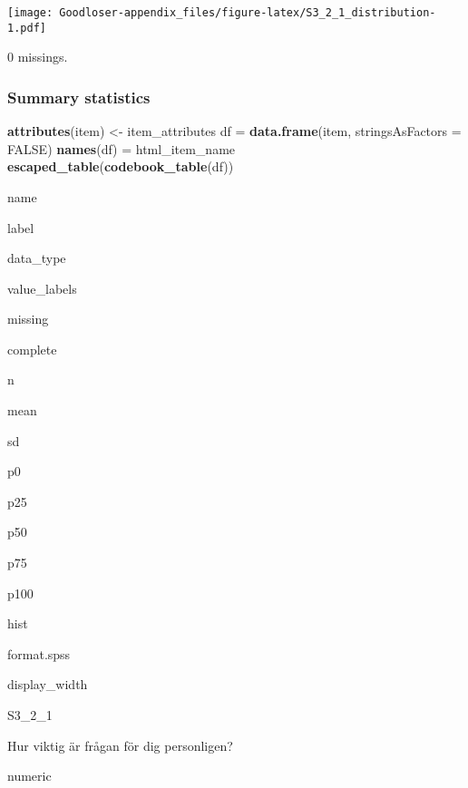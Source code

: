 \documentclass[]{book}
\newenvironment{Shaded}{\begin{snugshade}}{\end{snugshade}}
\newcommand{\KeywordTok}[1]{\textcolor[rgb]{0.13,0.29,0.53}{\textbf{#1}}}
\newcommand{\DataTypeTok}[1]{\textcolor[rgb]{0.13,0.29,0.53}{#1}}
\newcommand{\StringTok}[1]{\textcolor[rgb]{0.31,0.60,0.02}{#1}}
\newcommand{\OtherTok}[1]{\textcolor[rgb]{0.56,0.35,0.01}{#1}}
\newcommand{\OperatorTok}[1]{\textcolor[rgb]{0.81,0.36,0.00}{\textbf{#1}}}
\newcommand{\NormalTok}[1]{#1}
\begin{document}
\texttt{[image: Goodloser-appendix\_files/figure-latex/S3\_2\_1\_distribution-1.pdf]}

\begin{Shaded}
\end{Shaded}

0 missings.

\subsubsection{Summary statistics}\label{S3_2_1_summary}

\begin{Shaded}
\begin{Highlighting}[]
\KeywordTok{attributes}\NormalTok{(item) <-}\StringTok{ }\NormalTok{item_attributes}
\NormalTok{df =}\StringTok{ }\KeywordTok{data.frame}\NormalTok{(item, }\DataTypeTok{stringsAsFactors =} \OtherTok{FALSE}\NormalTok{)}
\KeywordTok{names}\NormalTok{(df) =}\StringTok{ }\NormalTok{html_item_name}
\KeywordTok{escaped_table}\NormalTok{(}\KeywordTok{codebook_table}\NormalTok{(df))}
\end{Highlighting}
\end{Shaded}

name

label

data\_type

value\_labels

missing

complete

n

mean

sd

p0

p25

p50

p75

p100

hist

format.spss

display\_width

S3\_2\_1

Hur viktig är frågan för dig personligen?

numeric
\end{document}

